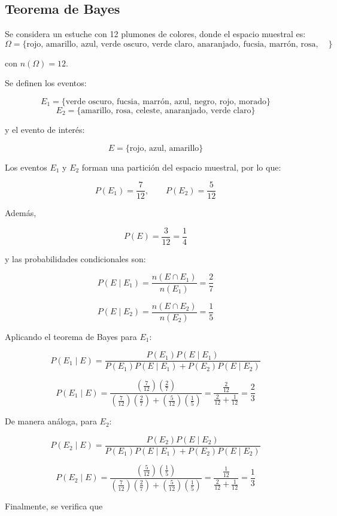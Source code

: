 \documentclass[10pt,letterpaper]{article}
\begin{document}
\subsection{Teorema de Bayes}

Se considera un estuche con 12 plumones de colores, donde el espacio muestral es:
$$
\Omega = \{\text{rojo, amarillo, azul, verde oscuro, verde claro, anaranjado, fucsia, marrón, rosa, celeste, negro, morado}\}
$$

con $n(\Omega)=12$.

Se definen los eventos:

$$
E_1 = \{\text{verde oscuro, fucsia, marrón, azul, negro, rojo, morado}\}
$$
$$
E_2 = \{\text{amarillo, rosa, celeste, anaranjado, verde claro}\}
$$

y el evento de interés:

$$
E = \{\text{rojo, azul, amarillo}\}
$$

Los eventos $E_1$ y $E_2$ forman una partición del espacio muestral, por lo que:

$$
P(E_1)=\frac{7}{12}, \qquad P(E_2)=\frac{5}{12}
$$

Además,

$$
P(E)=\frac{3}{12}=\frac{1}{4}
$$

y las probabilidades condicionales son:

$$
P(E\mid E_1)=\frac{n(E\cap E_1)}{n(E_1)} = \frac{2}{7}
$$

$$
P(E\mid E_2)=\frac{n(E\cap E_2)}{n(E_2)} = \frac{1}{5}
$$

Aplicando el teorema de Bayes para $E_1$:

$$
P(E_1\mid E)=\frac{P(E_1)P(E\mid E_1)}{P(E_1)P(E\mid E_1)+P(E_2)P(E\mid E_2)}
$$

$$
P(E_1\mid E)=\frac{\left(\frac{7}{12}\right)\left(\frac{2}{7}\right)}{\left(\frac{7}{12}\right)\left(\frac{2}{7}\right)+\left(\frac{5}{12}\right)\left(\frac{1}{5}\right)}
=\frac{\frac{2}{12}}{\frac{2}{12}+\frac{1}{12}}
=\frac{2}{3}
$$

De manera análoga, para $E_2$:

$$
P(E_2\mid E)=\frac{P(E_2)P(E\mid E_2)}{P(E_1)P(E\mid E_1)+P(E_2)P(E\mid E_2)}
$$

$$
P(E_2\mid E)=\frac{\left(\frac{5}{12}\right)\left(\frac{1}{5}\right)}{\left(\frac{7}{12}\right)\left(\frac{2}{7}\right)+\left(\frac{5}{12}\right)\left(\frac{1}{5}\right)}
=\frac{\frac{1}{12}}{\frac{2}{12}+\frac{1}{12}}
=\frac{1}{3}
$$

Finalmente, se verifica que
\end{document}
